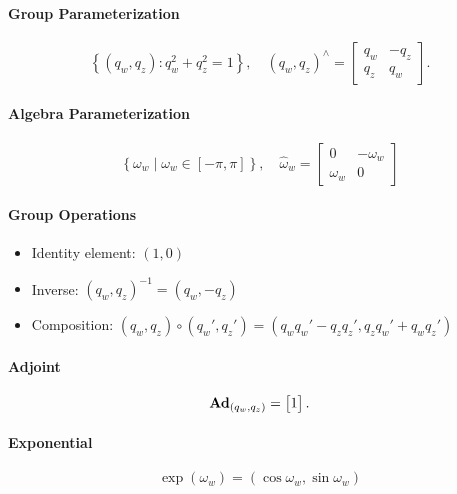 \begin{properties}[breakable, title={$\SOtwo$ parameterized by $\Uone$}]
\paragraph{Group Parameterization}
\begin{equation}
  \left\{ (q_{w}, q_{z}) : q_{w}^{2} + q_{z}^{2} = 1 \right\}, \quad (q_{w}, q_{z})^{\wedge} = \begin{bmatrix} q_{w} & -q_{z} \\ q_{z} & q_{w} \end{bmatrix}.
\end{equation}

\paragraph{Algebra Parameterization}
\begin{equation}
  \left\{ \omega_{w} \mid \omega_{w} \in [-\pi, \pi] \right\}, \quad \hat \omega_{w} = \begin{bmatrix} 0 & -\omega_{w} \\ \omega_{w} & 0 \end{bmatrix}
\end{equation}

\paragraph{Group Operations}
\begin{itemize}
  \item Identity element: $(1, 0)$
  \item Inverse: $(q_{w}, q_{z})^{-1} = (q_{w}, -q_{z})$
  \item Composition: $(q_{w}, q_{z}) \circ (q_{w}', q_{z}') = (q_{w} q_{w}' - q_{z} q_{z}', q_{z} q_{w}' + q_{w} q_{z}')$
\end{itemize}

\paragraph{Adjoint}
\begin{equation}
  \operatorname{\textbf{Ad}}_{(q_{w}, q_{z})} = \begin{bmatrix} 1 \end{bmatrix}.
\end{equation}

\paragraph{Exponential}
\begin{equation}
  \exp (\omega_w) = (\cos \omega_{w}, \sin \omega_{w})
\end{equation}


\end{properties}
